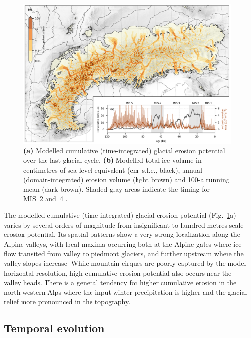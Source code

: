 \documentclass[esurf, manuscript]{copernicus}
\begin{document}
    \begin{figure}[ht]
      \centerline{\includegraphics{alpero_cumulative}}
      \caption{%
        \textbf{(a)} Modelled cumulative (time-integrated) glacial erosion
          potential over the last glacial cycle.
        \textbf{(b)} Modelled total ice volume in centimetres of sea-level
          equivalent (cm~s.l.e., black), annual (domain-integrated) erosion
          volume (light brown) and 100-a running mean (dark brown). Shaded gray
          areas indicate the timing for MIS~2 and~4
          \citep{Lisiecki.Raymo.2005}.}
        \label{fig:cumulative}
    \end{figure}

    The modelled cumulative (time-integrated) glacial erosion potential
    (Fig.~\ref{fig:cumulative}a) varies by several orders of magnitude
    from insignificant to hundred-metres-scale erosion potential. Its spatial
    patterns show a very strong localization along the Alpine valleys, with
    local maxima occurring both at
    the Alpine gates where ice flow transited from valley to piedmont glaciers,
    and further upstream where the valley slopes increase. While mountain
    cirques are poorly captured by the model horizontal resolution, high
    cumulative erosion potential also occurs near the valley heads.
    There is a general tendency for higher cumulative erosion in the
    north-western Alps where the input winter precipitation is higher
    \citep[WorldClim, Fig.~1h in][]{Seguinot.etal.2018} and the glacial relief
    more pronounced in the topography.

\subsection{Temporal evolution}
\end{document}
